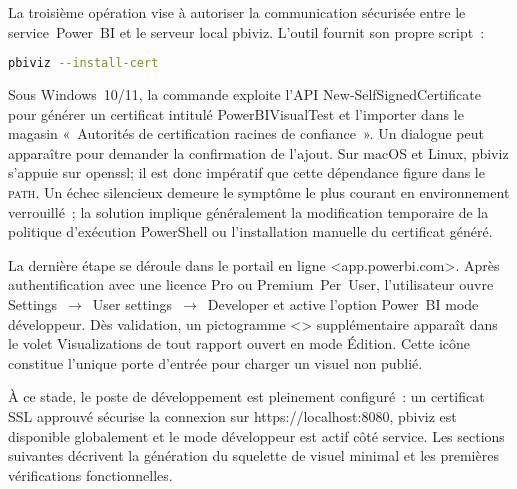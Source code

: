 La troisième opération vise à autoriser la communication sécurisée entre le service Power BI et le serveur local pbiviz. L’outil fournit son propre script :
\begin{lstlisting}[language=bash]
pbiviz --install-cert
\end{lstlisting}
Sous Windows 10/11, la commande exploite l’API New‑SelfSignedCertificate pour générer un certificat intitulé PowerBIVisualTest et l’importer dans le magasin « Autorités de certification racines de confiance ». Un dialogue peut apparaître pour demander la confirmation de l’ajout. Sur macOS et Linux, pbiviz s’appuie sur openssl; il est donc impératif que cette dépendance figure dans le \textsc{path}. Un échec silencieux demeure le symptôme le plus courant en environnement verrouillé ; la solution implique généralement la modification temporaire de la politique d’exécution PowerShell ou l’installation manuelle du certificat généré.

La dernière étape se déroule dans le portail en ligne <app.powerbi.com>. Après authentification avec une licence Pro ou Premium Per User, l’utilisateur ouvre Settings \(\rightarrow\) User settings \(\rightarrow\) Developer et active l’option Power BI mode développeur. Dès validation, un pictogramme \textless{}\textgreater{} supplémentaire apparaît dans le volet Visualizations de tout rapport ouvert en mode Édition. Cette icône constitue l’unique porte d’entrée pour charger un visuel non publié.

À ce stade, le poste de développement est pleinement configuré : un certificat SSL approuvé sécurise la connexion sur https://localhost:8080, pbiviz est disponible globalement et le mode développeur est actif côté service. Les sections suivantes décrivent la génération du squelette de visuel minimal et les premières vérifications fonctionnelles.
